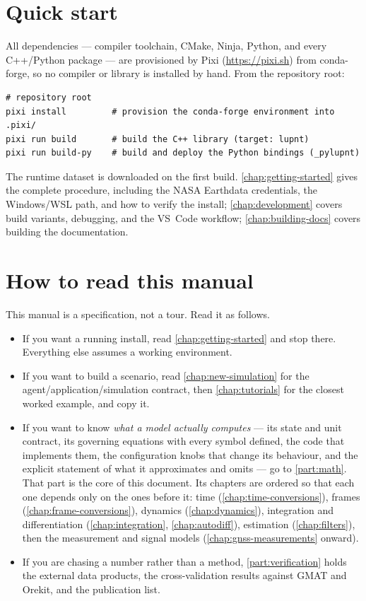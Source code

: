 \section{Quick start}
\label{sec:intro-quickstart}

All dependencies --- compiler toolchain, CMake, Ninja, Python, and every
C++/Python package --- are provisioned by Pixi (\url{https://pixi.sh}) from
conda-forge, so no compiler or library is installed by hand. From the
repository root:

\begin{lstlisting}[language=shell]
# repository root
pixi install         # provision the conda-forge environment into .pixi/
pixi run build       # build the C++ library (target: lupnt)
pixi run build-py    # build and deploy the Python bindings (_pylupnt)
\end{lstlisting}

The runtime dataset is downloaded on the first build.
\cref{chap:getting-started} gives the complete procedure, including the NASA
Earthdata credentials, the Windows/WSL path, and how to verify the install; \cref{chap:development} covers build variants, debugging, and the
VS~Code workflow; \cref{chap:building-docs} covers building the documentation.

\section{How to read this manual}
\label{sec:intro-howtoread}

This manual is a specification, not a tour. Read it as follows.

\begin{itemize}[leftmargin=*]
  \item If you want a running install, read \cref{chap:getting-started} and
    stop there. Everything else assumes a working  environment.
  \item If you want to build a scenario, read \cref{chap:new-simulation} for
    the agent/application/simulation contract, then \cref{chap:tutorials} for
    the closest worked example, and copy it.
  \item If you want to know \emph{what a model actually computes} --- its
    state and unit contract, its governing equations with every symbol
    defined, the code that implements them, the configuration knobs that
    change its behaviour, and the explicit statement of what it approximates
    and omits --- go to \cref{part:math}. That part is the core of this
    document. Its chapters are ordered so that each one depends only on the
    ones before it: time (\cref{chap:time-conversions}), frames
    (\cref{chap:frame-conversions}), dynamics (\cref{chap:dynamics}),
    integration and differentiation (\cref{chap:integration},
    \cref{chap:autodiff}), estimation (\cref{chap:filters}), then the
    measurement and signal models (\cref{chap:gnss-measurements} onward).
  \item If you are chasing a number rather than a method, \cref{part:verification}
    holds the external data products, the cross-validation results against
    GMAT \citep{gmat2023} and Orekit, and the publication list.
\end{itemize}

